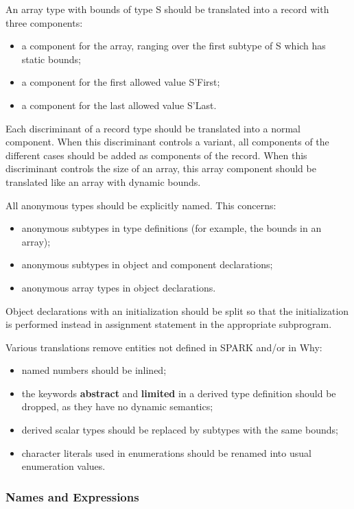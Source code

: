 \documentclass[fullpage]{article}
\newcounter{example}
\newcommand{\kw}[1]{\textbf{#1}}
\begin{document}
An array type with bounds of type S should be translated into a record with
three components:
\begin{itemize}
\item a component for the array, ranging over the first subtype of S which has
  static bounds;
\item a component for the first allowed value S'First;
\item a component for the last allowed value S'Last.
\end{itemize}

Each discriminant of a record type should be translated into a normal
component. When this discriminant controls a variant, all components of the
different cases should be added as components of the record. When this
discriminant controls the size of an array, this array component should be
translated like an array with dynamic bounds.

All anonymous types should be explicitly named. This concerns:
\begin{itemize}
\item anonymous subtypes in type definitions (for example, the bounds in an
  array);
\item anonymous subtypes in object and component declarations;
\item anonymous array types in object declarations.
\end{itemize}

Object declarations with an initialization should be split so that the
initialization is performed instead in assignment statement in the appropriate
subprogram.

Various translations remove entities not defined in SPARK and/or in Why:
\begin{itemize}
\item named numbers should be inlined;
\item the keywords \kw{abstract} and \kw{limited} in a derived type definition
  should be dropped, as they have no dynamic semantics;
\item derived scalar types should be replaced by subtypes with the same bounds;
\item character literals used in enumerations should be renamed into usual
  enumeration values.
\end{itemize}

\subsubsection{Names and Expressions}
\end{document}
